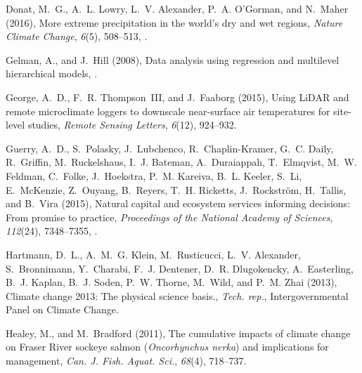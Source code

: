 \documentclass[linenumbers,draft]{AGUJournal}
\begin{document}
\begin{thebibliography}{30}
Donat, M.~G., A.~L. Lowry, L.~V. Alexander, P.~A. O'Gorman, and N.~Maher
  (2016), More extreme precipitation in the world's dry and wet regions,
  \textit{Nature Climate Change}, \textit{6}(5), 508--513,
  .

Gelman, A., and J.~Hill (2008), Data analysis using regression and multilevel
  hierarchical models, .

George, A.~D., F.~R. Thompson~III, and J.~Faaborg (2015), Using {L}i{DAR} and
  remote microclimate loggers to downscale near-surface air temperatures for
  site-level studies, \textit{Remote Sensing Letters}, \textit{6}(12),
  924--932.

Guerry, A.~D., S.~Polasky, J.~Lubchenco, R.~Chaplin-Kramer, G.~C. Daily,
  R.~Griffin, M.~Ruckelshaus, I.~J. Bateman, A.~Duraiappah, T.~Elmqvist, M.~W.
  Feldman, C.~Folke, J.~Hoekstra, P.~M. Kareiva, B.~L. Keeler, S.~Li,
  E.~McKenzie, Z.~Ouyang, B.~Reyers, T.~H. Ricketts, J.~Rockstr{\"o}m,
  H.~Tallis, and B.~Vira (2015), Natural capital and ecosystem services
  informing decisions: From promise to practice, \textit{Proceedings of the
  National Academy of Sciences}, \textit{112}(24), 7348--7355,
  .

Hartmann, D.~L., A.~M.~G. Klein, M.~Rusticucci, L.~V. Alexander, S.~Bronnimann,
  Y.~Charabi, F.~J. Dentener, D.~R. Dlugokencky, A.~Easterling, B.~J. Kaplan,
  B.~J. Soden, P.~W. Thorne, M.~Wild, and P.~M. Zhai (2013), Climate change
  2013: The physical science basis., \textit{Tech. rep.}, Intergovernmental
  Panel on Climate Change.

Healey, M., and M.~Bradford (2011), The cumulative impacts of climate change on
  {F}raser {R}iver sockeye salmon (\textit{{O}ncorhynchus nerka}) and
  implications for management, \textit{Can. J. Fish. Aquat. Sci.},
  \textit{68}(4), 718--737.


\end{thebibliography}
\end{document}
